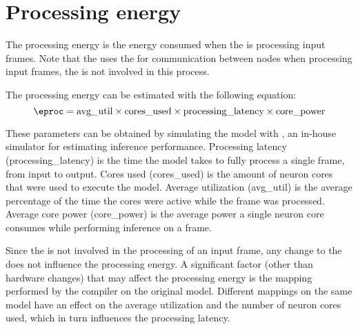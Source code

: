 \section{Processing energy}
The processing energy is the energy consumed when the \graicore{} is processing input frames.
Note that the \graicore{} uses the \eventnoc{} for communication between nodes when processing input frames, the \confignoc{} is not involved in this process.

The processing energy can be estimated with the following equation:
\begin{equation}
    \eproc = \textrm{avg\_util} \times \textrm{cores\_used} \times \textrm{processing\_latency} \times \textrm{core\_power}
\end{equation}

These parameters can be obtained by simulating the model with \graipefruit{}, an in-house simulator for estimating inference performance.
Processing latency (\textrm{processing\_latency}) is the time the model takes to fully process a single frame, from input to output.
Cores used (\textrm{cores\_used}) is the amount of neuron cores that were used to execute the model.
Average utilization (\textrm{avg\_util}) is the average percentage of the time the cores were active while the frame was processed. 
Average core power (\textrm{core\_power}) is the average power a single neuron core consumes while performing inference on a frame.

Since the \confignoc{} is not involved in the processing of an input frame, any change to the \confignoc{} does not influence the processing energy.
A significant factor (other than hardware changes) that may affect the processing energy is the mapping performed by the compiler on the original model. 
Different mappings on the same model have an effect on the average utilization and the number of neuron cores used, which in turn influences the processing latency.
